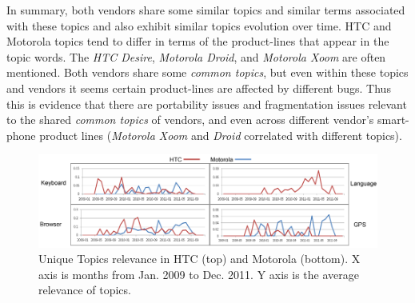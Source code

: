 \documentclass[10pt, conference, compsocconf]{IEEEtran}
\begin{document}
In summary, both vendors share some similar topics and similar terms associated
with these topics and also exhibit similar topics evolution over
time. 
HTC and Motorola topics tend to differ in terms of the
product-lines that appear in the topic words.
The \emph{HTC Desire}, \emph{Motorola Droid}, and  \emph{Motorola Xoom} are often
mentioned.
Both vendors share some \emph{common topics}, but even within these
topics and vendors it seems certain product-lines are affected by
different bugs. Thus this is evidence that there are portability
issues and fragmentation issues relevant to the shared \emph{common topics}
of vendors, and even across different vendor's smart-phone product
lines (\emph{Motorola Xoom} and \emph{Droid} correlated with different topics).



\begin{figure}
\centering
\includegraphics[width=1\textwidth]{combinedunique.png}
\caption{Unique Topics relevance in HTC (top) and Motorola (bottom). X axis is months from Jan. 2009 to Dec. 2011. Y axis is the average relevance of topics.}
\label{uniquehtc}
\label{uniquemoto}
\end{figure}

\end{document}
